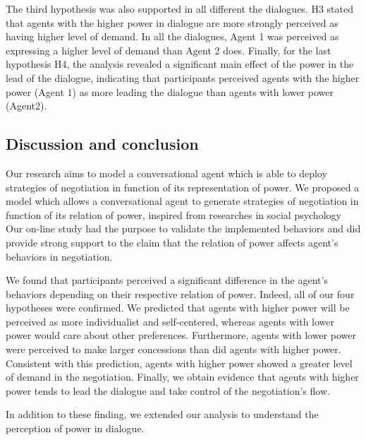 \documentclass{llncs}
\begin{document}
	\par The third hypothesis was also supported in all different the dialogues. H3 stated that agents with the higher power in dialogue are more strongly perceived as having higher level of demand. In all the dialogues, Agent 1 was perceived as expressing a higher level of demand than Agent 2 does. 
	Finally, for the last hypothesis H4, the analysis revealed a significant main effect of the power in the lead of the dialogue, indicating that participants perceived agents with the higher power (Agent 1) as more leading the dialogue than agents with lower power (Agent2). 
	
	\subsection{Discussion and conclusion}
	
	Our research aims to model a conversational agent which is able to deploy strategies of negotiation in function of its representation of power. 
	We proposed a model which allows a conversational agent to generate strategies of negotiation in function of its relation of power, inspired from researches in social psychology
	Our on-line study had the purpose to validate the implemented behaviors and did provide strong support to the claim that the relation of power affects agent's behaviors in negotiation.
	
	We found that participants perceived a significant difference in the agent's behaviors depending on their respective relation of power.  
	Indeed, all of our four hypotheses were confirmed. We predicted that agents with higher power will be perceived as more individualist and self-centered, whereas agents with lower power would care about other preferences. Furthermore, agents with lower power were perceived to make larger concessions than did agents with higher power. Consistent with this prediction, agents with higher power showed a greater level of demand in the negotiation. Finally, we obtain evidence that agents with higher power tends to lead the dialogue and take control of the negotiation's flow. 
	
	In addition to these finding, we extended our analysis to understand the perception of power in dialogue.
	
\end{document}
